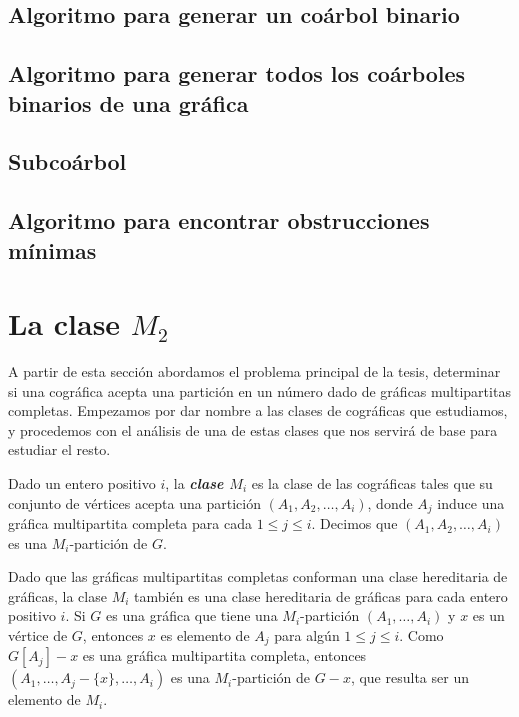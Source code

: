     \subsection{Algoritmo para generar un coárbol binario}
        
    \subsection{Algoritmo para generar todos los coárboles binarios de una gráfica}
        
    \subsection{Subcoárbol}
        
    \subsection{Algoritmo para encontrar obstrucciones mínimas} \label{sec_AlgoSub}
        


\section{La clase $M_2$}

A partir de esta sección abordamos el problema principal de la tesis,
determinar si una cográfica acepta una partición en un número dado de
gráficas multipartitas completas. Empezamos por dar nombre a las clases
de cográficas que estudiamos, y procedemos con el análisis de una de estas
clases que nos servirá de base para estudiar el resto.

Dado un entero positivo $i$, la \textbf{\emph{clase $M_i$}} es la clase de
las cogr\'aficas tales que su conjunto de v\'ertices acepta una partición
$(A_1, A_2, \dots, A_i)$, donde $A_j$ induce una gráfica multipartita
completa para cada $1 \le j \le i$.  Decimos que $(A_1, A_2, \dots, A_i)$
es una $M_i$-partición de $G$.

Dado que las gráficas multipartitas completas conforman una clase
hereditaria de gráficas, la clase $M_i$ tambi\'en es una clase hereditaria
de gráficas para cada entero positivo $i$.   Si $G$ es una gr\'afica que
tiene una $M_i$-partición $(A_1, \dots, A_i)$ y $x$ es un v\'ertice de $G$,
entonces $x$ es elemento de $A_j$ para alg\'un $1 \le j \le i$. Como
$G[A_j]-x$ es una gráfica multipartita completa, entonces $(A_1, \dots,
A_j - \{x\}, \dots, A_i)$ es una $M_i$-partici\'on de $G-x$, que resulta
ser un elemento de $M_i$.

